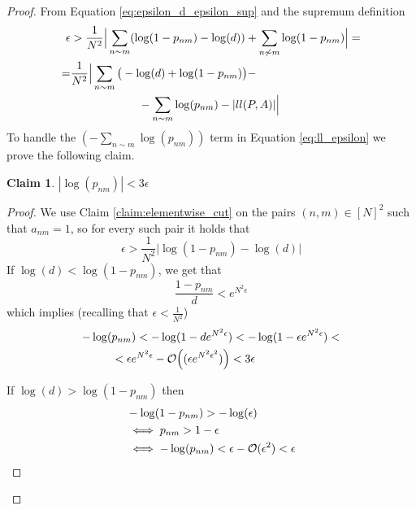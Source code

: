\documentclass[letterpaper]{article} %
\newtheorem{claim}[theorem]{Claim}
\begin{document}
\begin{proof}
    From Equation \ref{eq:epsilon_d_epsilon_sup} and the supremum definition
    \begingroup
    \footnotesize
    \begin{align}
    \label{eq:ll_epsilon}
        \epsilon &> \frac{1}{N^2}\Big|\sum_{\substack{n\sim m}}(\log(1-p_{nm}) - \log(d)) + \sum_{\substack{n\not\sim m}}\log(1-p_{nm}) \Big| =\notag\\ 
        = & \frac{1}{N^2}\Big|\sum_{\substack{n\sim m}}\big(-\log(d) + \log(1-p_{nm})\big) - \notag\\ 
        &\quad\quad\quad\quad\quad\quad - \sum_{\substack{n\sim m}}\log(p_{nm}) - |ll(P,A)|\Big|
    \end{align}
    \endgroup
    To handle the $(-\underset{{n\sim m}}{\sum}\log(p_{nm}))$ term in Equation \ref{eq:ll_epsilon} we prove the following claim.
    \begin{claim}
    \label{claim:log_pnm}
    $|\log(p_{nm})| < 3\epsilon$
    \end{claim} 
    \begin{proof}
        We use Claim \ref{claim:elementwise_cut} on the pairs $(n,m) \in [N]^2$ such that $a_{nm}= 1$, so for every such pair it holds that
        \begin{equation}
        \label{eq:neighbors_small}    
        \epsilon > \frac{1}{N^2}\Big|\log(1-p_{nm}) - \log(d)\Big|
        \end{equation}
        If $\log(d) < \log(1-p_{nm})$, we get that
        \[\frac{1-p_{nm}}{d} < e^{N^2\epsilon}\]
        which implies (recalling that $\epsilon < \frac{1}{N^2}$)
        \begin{align*}
          -\log(&p_{nm}) < -\log(1-de^{N^2\epsilon}) < -\log(1 - \epsilon e^{N^2\epsilon})< \notag \\
          & < \epsilon e^{N^2\epsilon} - \mathcal{O}\Big( ( \epsilon e^{N^2\epsilon^2}) \Big) < 3\epsilon
        \end{align*}

    If $\log(d) > \log(1-p_{nm})$ then
    \begin{align}
    &-\log(1-p_{nm}) > -\log(\epsilon)\notag \\
    & \iff p_{nm} > 1-\epsilon \notag\\
    & \iff -\log(p_{nm}) < \epsilon - \mathcal{O}(\epsilon^2) < \epsilon       \end{align}
    \end{proof}


\end{proof}
\end{document}
